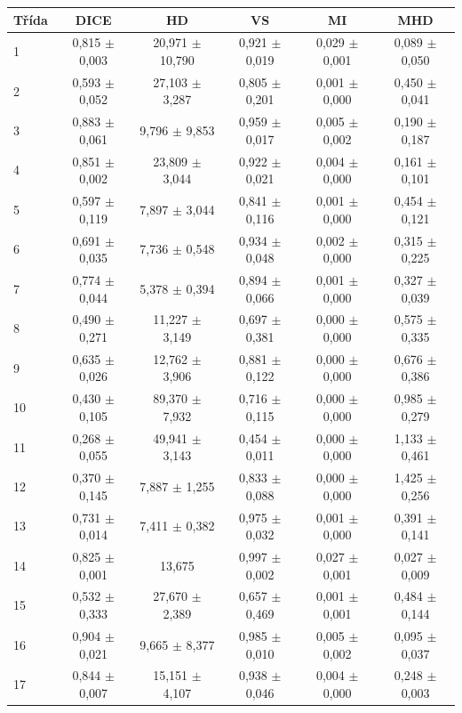 \begin{tabular}{l c c c c c}
 \hline
Třída & DICE & HD & VS & MI & MHD \\ \hline
1 & 0,815 $\pm$ 0,003 & 20,971 $\pm$ 10,790 & 0,921 $\pm$ 0,019 & 0,029 $\pm$ 0,001 & 0,089 $\pm$ 0,050 \\
2 & 0,593 $\pm$ 0,052 & 27,103 $\pm$ 3,287 & 0,805 $\pm$ 0,201 & 0,001 $\pm$ 0,000 & 0,450 $\pm$ 0,041 \\
3 & 0,883 $\pm$ 0,061 & 9,796 $\pm$ 9,853 & 0,959 $\pm$ 0,017 & 0,005 $\pm$ 0,002 & 0,190 $\pm$ 0,187 \\
4 & 0,851 $\pm$ 0,002 & 23,809 $\pm$ 3,044 & 0,922 $\pm$ 0,021 & 0,004 $\pm$ 0,000 & 0,161 $\pm$ 0,101 \\
5 & 0,597 $\pm$ 0,119 & 7,897 $\pm$ 3,044 & 0,841 $\pm$ 0,116 & 0,001 $\pm$ 0,000 & 0,454 $\pm$ 0,121 \\
6 & 0,691 $\pm$ 0,035 & 7,736 $\pm$ 0,548 & 0,934 $\pm$ 0,048 & 0,002 $\pm$ 0,000 & 0,315 $\pm$ 0,225 \\
7 & 0,774 $\pm$ 0,044 & 5,378 $\pm$ 0,394 & 0,894 $\pm$ 0,066 & 0,001 $\pm$ 0,000 & 0,327 $\pm$ 0,039 \\
8 & 0,490 $\pm$ 0,271 & 11,227 $\pm$ 3,149 & 0,697 $\pm$ 0,381 & 0,000 $\pm$ 0,000 & 0,575 $\pm$ 0,335 \\
9 & 0,635 $\pm$ 0,026 & 12,762 $\pm$ 3,906 & 0,881 $\pm$ 0,122 & 0,000 $\pm$ 0,000 & 0,676 $\pm$ 0,386 \\
10 & 0,430 $\pm$ 0,105 & 89,370 $\pm$ 7,932 & 0,716 $\pm$ 0,115 & 0,000 $\pm$ 0,000 & 0,985 $\pm$ 0,279 \\
11 & 0,268 $\pm$ 0,055 & 49,941 $\pm$ 3,143 & 0,454 $\pm$ 0,011 & 0,000 $\pm$ 0,000 & 1,133 $\pm$ 0,461 \\
12 & 0,370 $\pm$ 0,145 & 7,887 $\pm$ 1,255 & 0,833 $\pm$ 0,088 & 0,000 $\pm$ 0,000 & 1,425 $\pm$ 0,256 \\
13 & 0,731 $\pm$ 0,014 & 7,411 $\pm$ 0,382 & 0,975 $\pm$ 0,032 & 0,001 $\pm$ 0,000 & 0,391 $\pm$ 0,141 \\
14 & 0,825 $\pm$ 0,001 & 13,675 & 0,997 $\pm$ 0,002 & 0,027 $\pm$ 0,001 & 0,027 $\pm$ 0,009 \\
15 & 0,532 $\pm$ 0,333 & 27,670 $\pm$ 2,389 & 0,657 $\pm$ 0,469 & 0,001 $\pm$ 0,001 & 0,484 $\pm$ 0,144 \\
16 & 0,904 $\pm$ 0,021 & 9,665 $\pm$ 8,377 & 0,985 $\pm$ 0,010 & 0,005 $\pm$ 0,002 & 0,095 $\pm$ 0,037 \\
17 & 0,844 $\pm$ 0,007 & 15,151 $\pm$ 4,107 & 0,938 $\pm$ 0,046 & 0,004 $\pm$ 0,000 & 0,248 $\pm$ 0,003 \\

\end{tabular}
